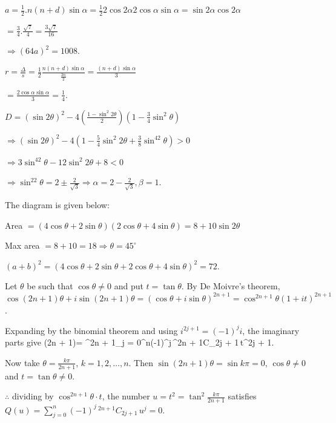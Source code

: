   $a = \frac{1}{2}.n(n + d)\sin\alpha = \frac{1}{2}2\cos2\alpha2\cos\alpha\sin\alpha
  = \sin2\alpha\cos2\alpha$

  $= \frac{3}{4}.\frac{\sqrt{7}}{4} = \frac{3\sqrt{7}}{16}$

  $\Rightarrow (64a)^2 = 1008$.

  $r = \frac{\Delta}{s} = \frac{1}{2}\frac{n(n + d)\sin\alpha}{\frac{3n}{2}} = \frac{(n + d)\sin\alpha}{3}$

  $= \frac{2\cos\alpha\sin\alpha}{3} = \frac{1}{4}$.
\item $D = (\sin2\theta)^2 - 4\left(\frac{1 - \sin^{2}2\theta}{2}\right)\left(1
  - \frac{3}{4}\sin^{2}\theta\right)$

  $\Rightarrow  (\sin2\theta)^2 - 4\left(1 - \frac{5}{4}\sin^{2}2\theta + \frac{3}{8}\sin^42\theta\right) > 0$

  $\Rightarrow 3\sin^42\theta - 12\sin^{2}2\theta + 8 < 0$

  $\Rightarrow \sin^22\theta = 2\pm\frac{2}{\sqrt{3}}\Rightarrow \alpha = 2 - \frac{2}{\sqrt{3}}, \beta =
  1$.
\item The diagram is given below:

  \startplacefigure
    \externalfigure[17_35.pdf]
  \stopplacefigure

  Area $= (4\cos\theta + 2\sin\theta)(2\cos\theta + 4\sin\theta) = 8 + 10\sin2\theta$

  Max area $= 8 + 10 = 18 \Rightarrow \theta = 45^\circ$

  $(a + b)^2 = (4\cos\theta + 2\sin\theta + 2\cos\theta + 4\sin\theta)^2 = 72$.
\item Let $\theta$ be such that $\cos\theta\neq 0$ and put $t = \tan\theta$. By De Moivre's theorem,
  $\cos(2n + 1)\theta + i\sin(2n + 1)\theta = (\cos\theta + i\sin\theta)^{2n + 1} = \cos^{2n + 1}\theta(1 +
  it)^{2n + 1}$.

  Expanding by the binomial theorem and using $i^{2j + 1} = (-1)^ji$, the imaginary parts give
  \startformula
    \sin(2n + 1)\theta = \cos^{2n + 1}\theta\sum_{j = 0}^{n}(-1)^j\,{}^{2n + 1}C_{2j + 1}\,t^{2j + 1}.
  \stopformula

  Now take $\theta = \frac{k\pi}{2n + 1}$, $k = 1, 2, \ldots, n$. Then $\sin(2n + 1)\theta = \sin k\pi = 0$,
  $\cos\theta\neq 0$ and $t = \tan\theta\neq 0$.

  $\therefore$ dividing by $\cos^{2n + 1}\theta\cdot t$, the number $u = t^2 = \tan^2\frac{k\pi}{2n + 1}$ satisfies
  $Q(u) = \displaystyle\sum_{j = 0}^{n}(-1)^j\,{}^{2n + 1}C_{2j + 1}\,u^j = 0$.

